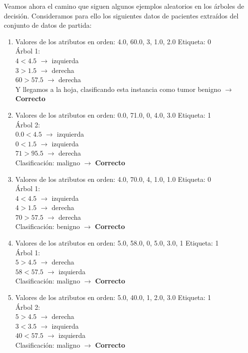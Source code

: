 \documentclass[a4paper,11pt]{article}
\begin{document}
Veamos ahora el camino que siguen algunos ejemplos aleatorios en los árboles de decisión. Consideramos para ello los siguientes datos de pacientes extraídos del conjunto de datos de partida:

\begin{enumerate}
	\item Valores de los atributos en orden: 4.0, 60.0, 3, 1.0, 2.0 Etiqueta: 0\\
	Árbol 1:\\
	 $4<4.5$ $\rightarrow$ izquierda\\
			  $ 3>1.5 $ $\rightarrow$ derecha\\
			  $ 60>57.5 $ $\rightarrow$ derecha\\
			  Y llegamos a la hoja, clasificando esta instancia como tumor benigno $\rightarrow$ \textbf{Correcto}
	\item Valores de los atributos en orden: 0.0, 71.0, 0, 4.0, 3.0	Etiqueta: 1\\
	Árbol 2:\\
	 $0.0 < 4.5$ $\rightarrow$ izquierda\\
			$ 0<1.5 $ $\rightarrow$ izquierda\\
			$ 71>95.5 $ $\rightarrow$ derecha\\
			Clasificación: maligno $\rightarrow$ \textbf{Correcto}
	\item Valores de los atributos en orden: 4.0, 70.0,	4, 1.0, 1.0	Etiqueta: 0\\
	Árbol 1:\\
		$ 4<4.5 $ $\rightarrow$ izquierda\\
		$ 4>1.5 $ $\rightarrow$ derecha\\
		$ 70>57.5 $ $\rightarrow$ derecha\\
		Clasificación: benigno $\rightarrow$ \textbf{Correcto}
		
	\item Valores de los atributos en orden: 5.0, 58.0,	0, 5.0, 3.0, 1 Etiqueta: 1\\
	Árbol 1:\\
	 $ 5>4.5 $ $\rightarrow$ derecha\\
	 $ 58<57.5 $ $\rightarrow$ izquierda\\
	 Clasificación: maligno $\rightarrow$ \textbf{Correcto}
	 
	 \item Valores de los atributos en orden: 5.0, 40.0, 1,	2.0, 3.0	 Etiqueta: 1\\
	 Árbol 2:\\
	 $ 5>4.5 $ $\rightarrow$ derecha\\
	 $ 3<3.5 $ $\rightarrow$ izquierda\\
	 $ 40<57.5 $ $\rightarrow$ izquierda \\
	 Clasificación: maligno $\rightarrow$ \textbf{Correcto}
	 
\end{enumerate}
\end{document}
